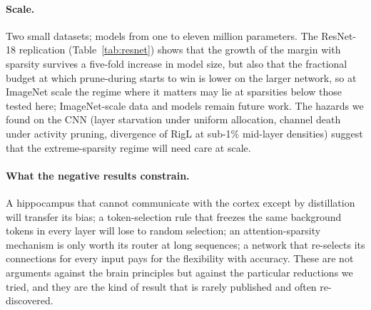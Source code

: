 \documentclass[11pt]{article}
\begin{document}
\paragraph{Scale.} Two small datasets; models from one to eleven million parameters. The ResNet-18 replication
(Table~\ref{tab:resnet}) shows that the growth of the margin with sparsity survives a five-fold increase in model size,
but also that the fractional budget at which prune-during starts to win is lower on the larger network, so at ImageNet
scale the regime where it matters may lie at sparsities below those tested here; ImageNet-scale data and models remain
future work. The hazards we
found on the CNN (layer starvation under uniform allocation, channel death under activity pruning, divergence of RigL at
sub-1\% mid-layer densities) suggest that the extreme-sparsity regime will need care at scale.

\paragraph{What the negative results constrain.} A hippocampus that cannot communicate with the cortex except by distillation
will transfer its bias; a token-selection rule that freezes the same background tokens in every layer will lose to random
selection; an
attention-sparsity mechanism is only worth its router at long sequences; a network that re-selects its connections for every
input pays for the flexibility with accuracy. These are not arguments against the brain principles
but against the particular reductions we tried, and they are the kind of result that is rarely published and often re-discovered.
\end{document}
